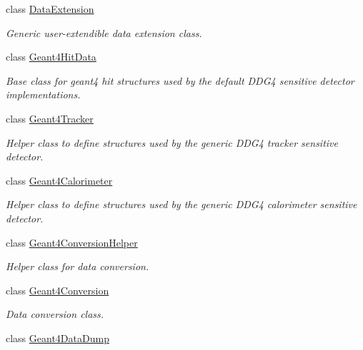 \begin{DoxyCompactItemize}
class \hyperlink{class_d_d4hep_1_1_simulation_1_1_data_extension}{DataExtension}
\begin{DoxyCompactList}\small\item\em Generic user-\/extendible data extension class. \item\end{DoxyCompactList}\item 
class \hyperlink{class_d_d4hep_1_1_simulation_1_1_geant4_hit_data}{Geant4HitData}
\begin{DoxyCompactList}\small\item\em Base class for geant4 hit structures used by the default DDG4 sensitive detector implementations. \item\end{DoxyCompactList}\item 
class \hyperlink{class_d_d4hep_1_1_simulation_1_1_geant4_tracker}{Geant4Tracker}
\begin{DoxyCompactList}\small\item\em Helper class to define structures used by the generic DDG4 tracker sensitive detector. \item\end{DoxyCompactList}\item 
class \hyperlink{class_d_d4hep_1_1_simulation_1_1_geant4_calorimeter}{Geant4Calorimeter}
\begin{DoxyCompactList}\small\item\em Helper class to define structures used by the generic DDG4 calorimeter sensitive detector. \item\end{DoxyCompactList}\item 
class \hyperlink{class_d_d4hep_1_1_simulation_1_1_geant4_conversion_helper}{Geant4ConversionHelper}
\begin{DoxyCompactList}\small\item\em Helper class for data conversion. \item\end{DoxyCompactList}\item 
class \hyperlink{class_d_d4hep_1_1_simulation_1_1_geant4_conversion}{Geant4Conversion}
\begin{DoxyCompactList}\small\item\em Data conversion class. \item\end{DoxyCompactList}\item 
class \hyperlink{class_d_d4hep_1_1_simulation_1_1_geant4_data_dump}{Geant4DataDump}

\end{DoxyCompactItemize}
